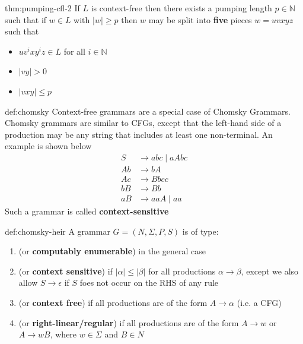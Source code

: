 \documentclass[landscape, 8pt]{extarticle}
\begin{document}
\begin{multicols}{3}
\begin{thm}{thm:pumping-cfl-2}{}
If $L$ is context-free then there exists a pumping length $p\in\mathbb{N}$ such that if $w\in L$ with $\lvert w\rvert \ge p$ then $w$ may be split into \textbf{five} pieces $w = uvxyz$ such that
\renewcommand\labelitemi{\tiny$\bullet$}
\begin{itemize}
    \setlength\itemsep{0em}
    \item $uv^{i}xy^{i}z\in L$ for all $i\in \mathbb{N}$ 
    \item $\lvert vy\rvert > 0$
    \item $\lvert vxy\rvert \le p$
\end{itemize}
\end{thm}

\begin{dfn}{def:chomsky}{}
Context-free grammars are a special case of Chomsky Grammars. Chomsky grammars are similar to CFGs, except that the left-hand side of a production may be any string that includes at least one non-terminal. An example is shown below
\begin{align*}
    S &\to abc \mid aAbc \\
    Ab &\to bA \\
    Ac &\to Bbcc \\
    bB &\to Bb \\
    aB &\to aaA \mid aa
\end{align*}
Such a grammar is called \textbf{context-sensitive}
\end{dfn}

\begin{dfn}{def:chomsky-heir}{}
A grammar $G = (N,\Sigma, P, S)$ is of type:
\renewcommand\labelitemi{\tiny$\bullet$}
\begin{enumerate}\addtocounter{enumi}{-1}
    \setlength\itemsep{0em}
    \item (or \textbf{computably enumerable}) in the general case
    \item (or \textbf{context sensitive}) if $\lvert \alpha \rvert \le \lvert  \beta\rvert $ for all productions $\alpha\to \beta$, except we also allow $S\to \epsilon$ if $S$ foes not occur on the RHS of any rule
    \item (or \textbf{context free}) if all productions are of the form $A\to \alpha$ (i.e. a CFG)
    \item (or \textbf{right-linear/regular}) if all productions are of the form $A\to w$ or $A\to wB$, where $w\in \Sigma$ and $B\in N$
\end{enumerate}
\end{dfn}


\end{multicols}
\end{document}
